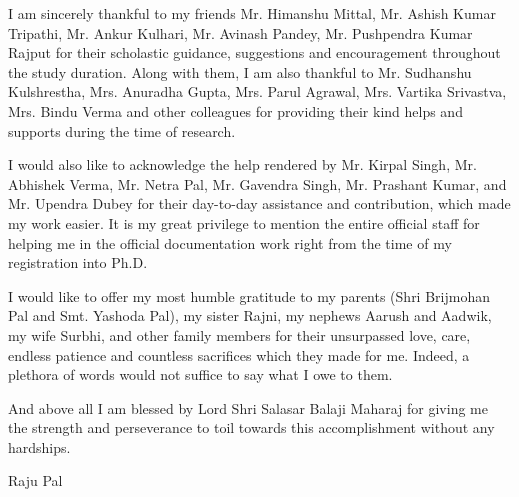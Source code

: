 \begin{acknowledgements}
	 I am sincerely thankful to my friends Mr. Himanshu Mittal, Mr. Ashish Kumar Tripathi, Mr. Ankur Kulhari, Mr. Avinash Pandey, Mr. Pushpendra Kumar Rajput  for their scholastic guidance, suggestions and encouragement throughout the study duration. Along with them, I am also thankful to Mr. Sudhanshu Kulshrestha, Mrs. Anuradha Gupta, Mrs. Parul Agrawal, Mrs. Vartika Srivastva, Mrs. Bindu Verma and other colleagues for providing their kind helps and supports during the time of research.

	I would also like to acknowledge the help rendered by Mr. Kirpal Singh, Mr. Abhishek Verma, Mr. Netra Pal, Mr. Gavendra Singh, Mr. Prashant Kumar, and Mr. Upendra Dubey for their day-to-day assistance and contribution, which made my work easier. It is my great privilege to mention the entire official staff for helping me in the official documentation work right from the time of my registration into Ph.D.

	I would like to offer my most humble gratitude to my parents (Shri Brijmohan Pal and Smt. Yashoda Pal), my sister Rajni, my nephews Aarush and Aadwik, my wife Surbhi, and other family members for their unsurpassed love, care, endless patience and countless sacrifices which they made for me. Indeed, a plethora of words would not suffice to say what I owe to them.

And above all I am blessed by Lord Shri Salasar Balaji Maharaj for giving me the strength and perseverance to toil towards this accomplishment without any hardships.


\begin{flushright}
    Raju Pal
\end{flushright}

\end{acknowledgements}


